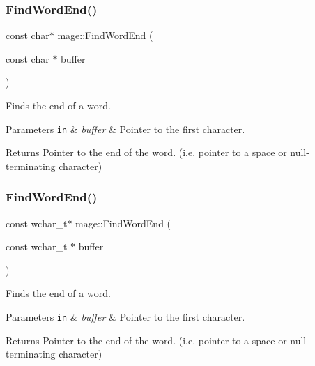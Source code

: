 \subsubsection{\texorpdfstring{Find\+Word\+End()}{FindWordEnd()}\hspace{0.1cm}{\footnotesize\ttfamily [1/2]}}
{\footnotesize\ttfamily const char$\ast$ mage\+::\+Find\+Word\+End (\begin{DoxyParamCaption}\item[{const char $\ast$}]{buffer }\end{DoxyParamCaption})}

Finds the end of a word.


\begin{DoxyParams}[1]{Parameters}
\mbox{\tt in}  & {\em buffer} & Pointer to the first character. \\
\hline
\end{DoxyParams}
\begin{DoxyReturn}{Returns}
Pointer to the end of the word. (i.\+e. pointer to a space or null-\/terminating character) 
\end{DoxyReturn}
\hypertarget{namespacemage_a39ee0a00cc5259ed6bb9d1ff85d9fd80}{}\label{namespacemage_a39ee0a00cc5259ed6bb9d1ff85d9fd80} 
\subsubsection{\texorpdfstring{Find\+Word\+End()}{FindWordEnd()}\hspace{0.1cm}{\footnotesize\ttfamily [2/2]}}
{\footnotesize\ttfamily const wchar\+\_\+t$\ast$ mage\+::\+Find\+Word\+End (\begin{DoxyParamCaption}\item[{const wchar\+\_\+t $\ast$}]{buffer }\end{DoxyParamCaption})}

Finds the end of a word.


\begin{DoxyParams}[1]{Parameters}
\mbox{\tt in}  & {\em buffer} & Pointer to the first character. \\
\hline
\end{DoxyParams}
\begin{DoxyReturn}{Returns}
Pointer to the end of the word. (i.\+e. pointer to a space or null-\/terminating character) 
\end{DoxyReturn}
\hypertarget{namespacemage_a401c54df21447c491c527735647b5f80}{}\label{namespacemage_a401c54df21447c491c527735647b5f80} 
